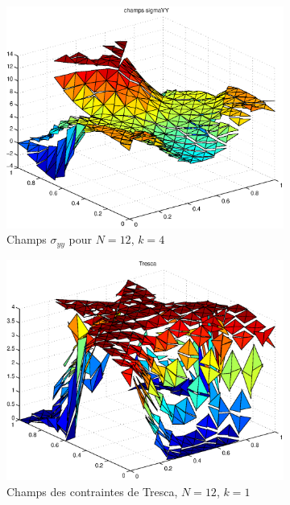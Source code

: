 \begin{figure}[h!]
\begin{subfigure}[b]{0.32\textwidth}
  \includegraphics[width=\textwidth]{images/sigmayyk4.eps}
  \caption{Champs $\sigma_{yy}$ pour $N=12$, $k=4$}
  \end{subfigure}
  \begin{subfigure}[b]{0.32\textwidth}
  \includegraphics[width=\textwidth]{images/Tresca.eps}
  \caption{Champs des contraintes de Tresca, $N=12$, $k=1$}
  \label{fig:Tresca}
  \end{subfigure}
  ~
  \begin{subfigure}[b]{0.32\textwidth}

\end{subfigure}
\end{figure}
